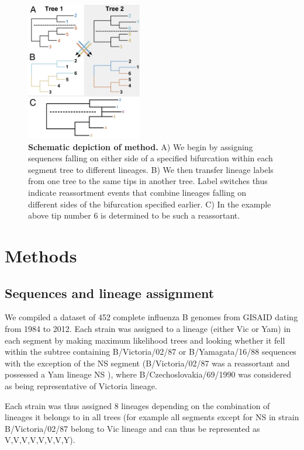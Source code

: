 \documentclass[11pt,oneside,letterpaper]{article}
\begin{document}
\begin{figure}[h]
 \centering		
	\includegraphics[width=0.45\textwidth]{figures/TreeFigure2}
	\caption{\textbf{Schematic depiction of method.}
A) We begin by assigning sequences falling on either side of a specified bifurcation within each segment tree to different lineages.
B) We then transfer lineage labels from one tree to the same tips in another tree.
Label switches thus indicate reassortment events that combine lineages falling on different sides of the bifurcation specified earlier.
C) In the example above tip number 6 is determined to be such a reassortant.}
	\label{methodFig}
\end{figure}

\section*{Methods}

\subsection*{Sequences and lineage assignment}

We compiled a dataset of 452 complete influenza B genomes from GISAID \cite{GISAID} dating from 1984 to 2012. 
Each strain was assigned to a lineage (either Vic or Yam) in each segment by making maximum likelihood trees and looking whether it fell within the subtree containing B/Victoria/02/87 or B/Yamagata/16/88 sequences with the exception of the NS segment (B/Victoria/02/87 was a reassortant and possessed a Yam lineage NS \cite{lindstrom1999}), where B/Czechoslovakia/69/1990 was considered as being representative of Victoria lineage.

Each strain was thus assigned 8 lineages depending on the combination of lineages it belongs to in all trees (for example all segments except for NS in strain B/Victoria/02/87 belong to Vic lineage and can thus be represented as V,V,V,V,V,V,V,Y). 
\end{document}
